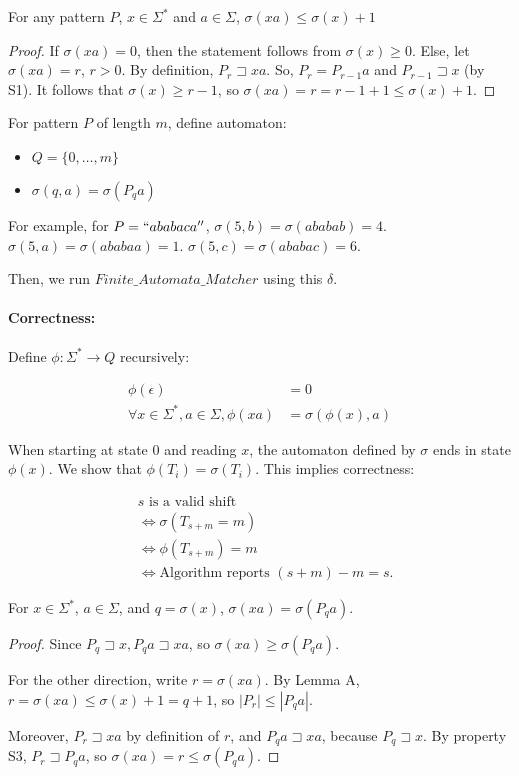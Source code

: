 \begin{mylemma}[A]
For any pattern $P$, $x \in \Sigma^\ast$ and $a \in \Sigma$, $\sigma(xa) \le \sigma(x) + 1$	
\end{mylemma}
\begin{proof}
	If $\sigma(xa) = 0$, then the statement follows from $\sigma(x) \ge 0$. Else, let $\sigma(xa) = r$, $r>0$. By definition, $P_r \sqsupset xa$. So, $P_r = P_{r-1} a$ and $P_{r-1}\sqsupset x$ (by S1). It follows that $\sigma(x) \ge r-1$, so $\sigma(xa) = r = r -1 + 1 \le \sigma(x) + 1$.
\end{proof}

For pattern $P$ of length $m$, define automaton:

\begin{itemize}
	\item $Q = \{0, \ldots, m\}$
	\item $\sigma(q,a) = \sigma(P_q a)$
\end{itemize}

For example, for $P=``ababaca''$, $\sigma(5,b) = \sigma(ababab)=4$. $\sigma(5,a) = \sigma(ababaa)=1$. $\sigma(5,c) = \sigma(ababac)=6$.

\bigskip

Then, we run ${Finite\_Automata\_Matcher}$ using this $\delta$.

\paragraph{Correctness:} Define $\phi: \Sigma^\ast \rightarrow Q$ recursively:

\begin{align*}
	\phi(\epsilon) &= 0 \\
	\forall x \in \Sigma^\ast, a \in \Sigma, \phi(xa) &= \sigma(\phi(x), a)
\end{align*}

When starting at state 0 and reading $x$, the automaton defined by $\sigma$ ends in state $\phi(x)$. We show that $\phi(T_i) = \sigma(T_i)$. This implies correctness:

\begin{align*}
	& s \text{ is a valid shift} \\
	&\iff \sigma(T_{s+m} = m) \\
	&\iff \phi(T_{s+m}) = m \\
	&\iff \text{Algorithm reports $(s+m) - m = s$}.
\end{align*}

\begin{mylemma}[B]
For $x \in \Sigma^\ast$, $a \in \Sigma$, and $q = \sigma(x)$, $\sigma(xa) = \sigma(P_q a)$.	
\end{mylemma}
\begin{proof}
	Since $P_q \sqsupset x, P_q a \sqsupset xa$, so $\sigma(xa) \ge \sigma(P_q a)$.
	
	For the other direction, write $r = \sigma(xa)$. By Lemma A, $r = \sigma(xa) \le \sigma(x) + 1 = q + 1$, so $|P_r| \le |P_q a|$.
	
	Moreover, $P_r \sqsupset xa$ by definition of $r$, and $P_q a \sqsupset xa$, because $P_q \sqsupset x$. By property S3, $P_r \sqsupset P_q a$, so $\sigma(xa) = r \le \sigma(P_q a)$.
\end{proof}

